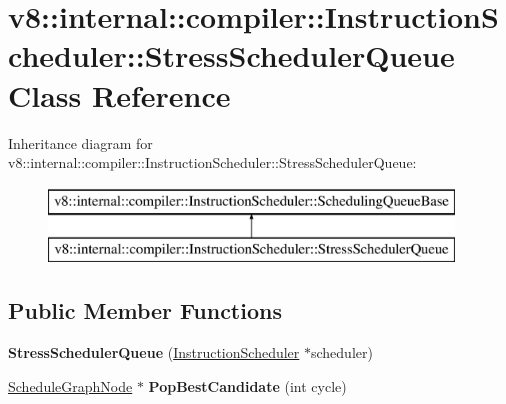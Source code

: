 \hypertarget{classv8_1_1internal_1_1compiler_1_1_instruction_scheduler_1_1_stress_scheduler_queue}{}\section{v8\+:\+:internal\+:\+:compiler\+:\+:Instruction\+Scheduler\+:\+:Stress\+Scheduler\+Queue Class Reference}
\label{classv8_1_1internal_1_1compiler_1_1_instruction_scheduler_1_1_stress_scheduler_queue}
Inheritance diagram for v8\+:\+:internal\+:\+:compiler\+:\+:Instruction\+Scheduler\+:\+:Stress\+Scheduler\+Queue\+:\begin{figure}[H]
\begin{center}
\leavevmode
\includegraphics[height=2.000000cm]{classv8_1_1internal_1_1compiler_1_1_instruction_scheduler_1_1_stress_scheduler_queue}
\end{center}
\end{figure}
\subsection*{Public Member Functions}
\begin{DoxyCompactItemize}
\item 
{\bfseries Stress\+Scheduler\+Queue} (\hyperlink{classv8_1_1internal_1_1compiler_1_1_instruction_scheduler}{Instruction\+Scheduler} $\ast$scheduler)\hypertarget{classv8_1_1internal_1_1compiler_1_1_instruction_scheduler_1_1_stress_scheduler_queue_a2d45136da5a1dbd4395ed7c9efec767b}{}\label{classv8_1_1internal_1_1compiler_1_1_instruction_scheduler_1_1_stress_scheduler_queue_a2d45136da5a1dbd4395ed7c9efec767b}

\item 
\hyperlink{classv8_1_1internal_1_1compiler_1_1_instruction_scheduler_1_1_schedule_graph_node}{Schedule\+Graph\+Node} $\ast$ {\bfseries Pop\+Best\+Candidate} (int cycle)\hypertarget{classv8_1_1internal_1_1compiler_1_1_instruction_scheduler_1_1_stress_scheduler_queue_a36cadb4845c70d493b52665f0599952e}{}\label{classv8_1_1internal_1_1compiler_1_1_instruction_scheduler_1_1_stress_scheduler_queue_a36cadb4845c70d493b52665f0599952e}

\end{DoxyCompactItemize}
